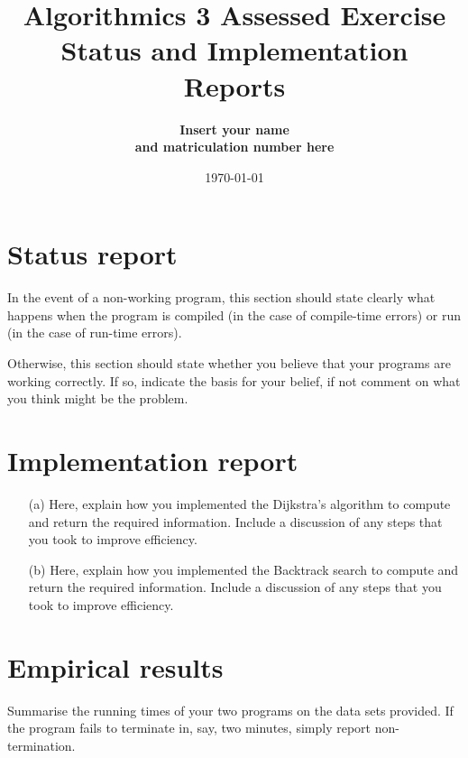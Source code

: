 \documentclass{article}
\title{Algorithmics 3 Assessed Exercise\\ \vspace{4mm} 
Status and Implementation Reports}
\author{\bf Insert your name\\ \bf and matriculation number here}
\date{\today}
\begin{document}
\maketitle

\section*{Status report}

In the event of a non-working program, this section should state clearly what happens when the program is compiled (in the case of compile-time errors) or run (in the case of run-time errors).  

Otherwise, this section should state whether you believe that your programs are working correctly. If so, indicate the basis for your belief, if not comment on what you think might be the problem.

\section*{Implementation report}

\begin{itemize}
\item[(a)] 
Here, explain how you implemented the Dijkstra's algorithm to compute and return the required information. Include a discussion of any steps that you took to improve efficiency.
\item[(b)]
Here, explain how you implemented the Backtrack search to compute and return the required information. Include a discussion of any steps that you took to improve efficiency.
\end{itemize}

\section*{Empirical results}

Summarise the running times of your two programs on the data sets provided. If the program fails to terminate in, say, two minutes, simply report non-termination. 
\end{document}
